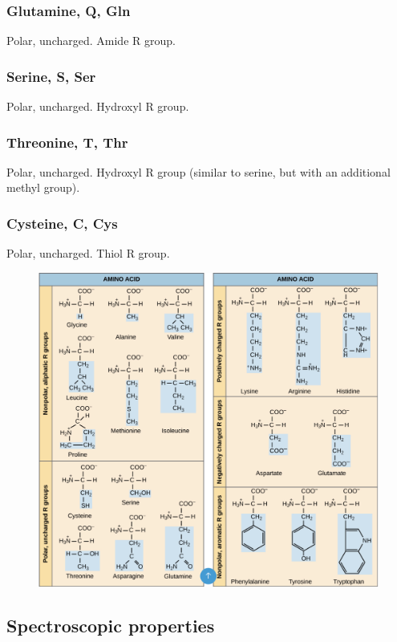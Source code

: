 \documentclass[letterpaper, 12pt]{article}
\begin{document}
\subsubsection*{Glutamine, Q, Gln}
Polar, uncharged. Amide R group.

\subsubsection*{Serine, S, Ser}
Polar, uncharged. Hydroxyl R group.

\subsubsection*{Threonine, T, Thr}
Polar, uncharged. Hydroxyl R group (similar to serine, but with an additional methyl group).

\subsubsection*{Cysteine, C, Cys}
Polar, uncharged. Thiol R group.

\begin{figure}[H]
\centering
\includegraphics[width=\textwidth]{aas_forreal}
\end{figure}

\subsection*{Spectroscopic properties}
\end{document}
